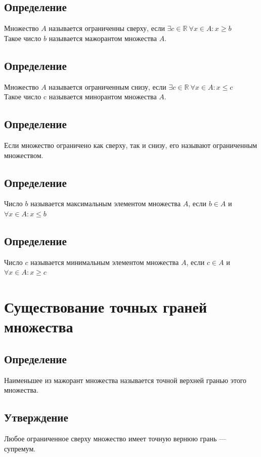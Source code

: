 \documentclass{article}
\begin{document}
\subsection{Определение}
Множество $A$ называется ограниченны сверху, если $\exists c \in \mathbb{R} ~ \forall x \in A: x \ge b$ \\
Такое число $b$ называется мажорантом множества $A$.


\subsection{Определение}
Множество $A$ называется ограниченным снизу, если $\exists c \in \mathbb{R} ~ \forall x \in A: x \le c$ \\
Такое число c называется минорантом множества $A$.


\subsection{Определение}
Если множество ограничено как сверху, так и снизу, его называют ограниченным множеством.


\subsection{Определение}
Число $b$ называется максимальным элементом множества $A$, если $b \in A$ и $\forall x \in A: x \le b$ 


\subsection{Определение}
Число $c$ называется минимальным элементом множества $A$, если $c \in A$ и $\forall x \in A: x \ge c$ 



\section{Существование точных граней множества}

\subsection{Определение}
Наименьшее из мажорант множества называется точной верхней гранью этого множества.


\subsection{Утверждение}
Любое ограниченное сверху множество имеет точную вернюю грань --- супремум.
\end{document}
